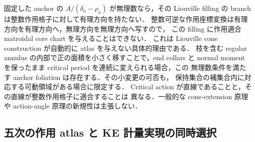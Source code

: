 \begin{remark}
固定した anchor の $A/(\delta_a-\rho_a)$ が無理数なら，その Liouville filling
の branch は整数作用格子に対して有理方向を持たない．
整数可逆な作用座標変換は有理方向を有理方向へ，無理方向を無理方向へ写すので，
この filling に作用適合 matroidal core chart を与えることはできない．
これは Liouville cone construction が自動的に atlas を与えない具体的理由である．
枝を含む regular annulus の内部で正の面積を小さく移すことで，end collars と
normal moment を保ったまま critical period を連続に変えられる場合，この
無理数条件を満たす anchor foliation は存在する．その小変更の可否も，
保持集合の補集合内に対応する可動領域がある場合に限定する．
Critical action が直線であることと，その直線が整数作用格子に適合することは
異なる．一般的な cone-extension 原理や action-angle 原理の新規性は主張しない．
\end{remark}

\subsection{五次の作用 atlas と KE 計量実現の同時選択}

